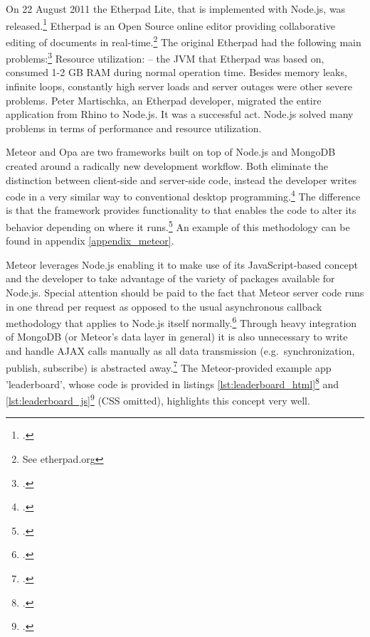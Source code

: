 \begin{appendices}
\begin{subappendices}
\label{app:etherpad}
On 22 August 2011 the Etherpad Lite, that is implemented with Node.js, was released.\footcite[Cf.][]{Martischka_2011}  Etherpad is an Open Source online editor providing collaborative editing of documents in real-time.\footnote{See etherpad.org} The original Etherpad had the following main problems:\footcite[Cf.][]{Martischka_2011} Resource utilization: – the JVM that Etherpad was based on, consumed 1-2 GB RAM during normal operation time. Besides memory leaks, infinite loops, constantly high server loads and server outages were other severe problems.
Peter Martischka, an Etherpad developer, migrated the entire application from Rhino to Node.js. It was a successful act. Node.js solved many problems in terms of performance and resource utilization. 

\label{appendix_meteor}
\FloatBarrier
Meteor and Opa are two frameworks built on top of Node.js and MongoDB created around a radically new development workflow. Both eliminate the distinction between client-side and server-side code, instead the developer writes code in a very similar way to conventional desktop programming.\footcite[Cf.][]{meteorDocs} The difference is that the framework provides functionality to that enables the code to alter its behavior depending on where it runs.\footcite[Cf.][]{meteorDocs} An example of this methodology can be found in appendix \ref{appendix_meteor}.

Meteor leverages Node.js enabling it to make use of its JavaScript-based concept and  the developer to take advantage of the variety of packages available for Node.js. Special attention should be paid to the fact that Meteor server code runs in one thread per request as opposed to the usual asynchronous callback methodology that applies to Node.js itself normally.\footcite[Cf.][]{meteorDocs} Through heavy integration of MongoDB (or Meteor's data layer in general) it is also unnecessary to write and handle AJAX calls manually as all data transmission (e.g.\ synchronization, publish, subscribe) is abstracted away.\footcite[Cf.][]{meteorDocs} The Meteor-provided example app 'leaderboard', whose code is provided in listings \ref{lst:leaderboard_html}\footcite[Cf.][]{leaderboard} and \ref{lst:leaderboard_js}\footcite[Cf.][]{leaderboard} (CSS omitted), highlights this concept very well.


\end{subappendices}
\end{appendices}
